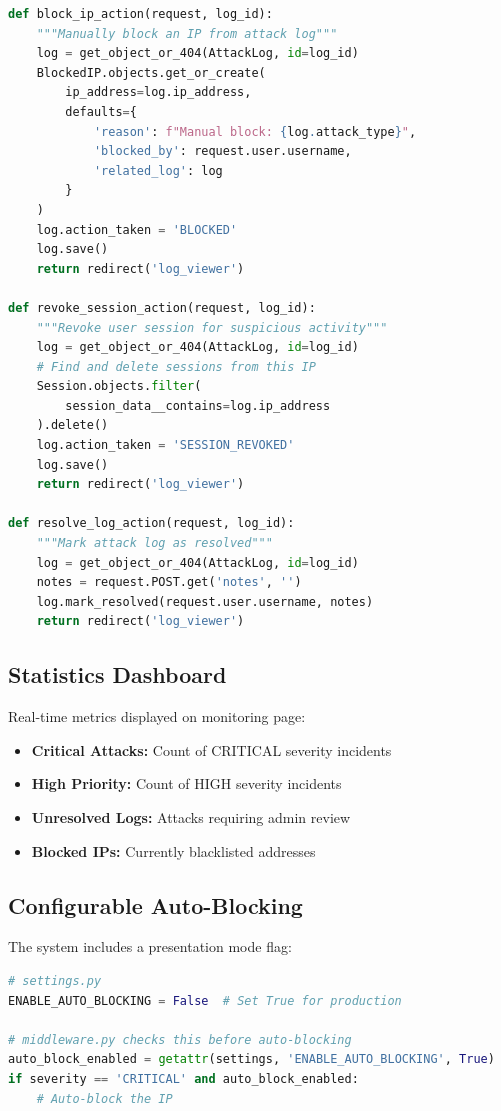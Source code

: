 \documentclass[12pt,a4paper]{article}
\begin{document}
\begin{lstlisting}[language=Python]
def block_ip_action(request, log_id):
    """Manually block an IP from attack log"""
    log = get_object_or_404(AttackLog, id=log_id)
    BlockedIP.objects.get_or_create(
        ip_address=log.ip_address,
        defaults={
            'reason': f"Manual block: {log.attack_type}",
            'blocked_by': request.user.username,
            'related_log': log
        }
    )
    log.action_taken = 'BLOCKED'
    log.save()
    return redirect('log_viewer')

def revoke_session_action(request, log_id):
    """Revoke user session for suspicious activity"""
    log = get_object_or_404(AttackLog, id=log_id)
    # Find and delete sessions from this IP
    Session.objects.filter(
        session_data__contains=log.ip_address
    ).delete()
    log.action_taken = 'SESSION_REVOKED'
    log.save()
    return redirect('log_viewer')

def resolve_log_action(request, log_id):
    """Mark attack log as resolved"""
    log = get_object_or_404(AttackLog, id=log_id)
    notes = request.POST.get('notes', '')
    log.mark_resolved(request.user.username, notes)
    return redirect('log_viewer')
\end{lstlisting}

\subsection{Statistics Dashboard}

Real-time metrics displayed on monitoring page:

\begin{itemize}[leftmargin=*]
    \item \textbf{Critical Attacks:} Count of CRITICAL severity incidents
    \item \textbf{High Priority:} Count of HIGH severity incidents  
    \item \textbf{Unresolved Logs:} Attacks requiring admin review
    \item \textbf{Blocked IPs:} Currently blacklisted addresses
\end{itemize}

\subsection{Configurable Auto-Blocking}

The system includes a presentation mode flag:

\begin{lstlisting}[language=Python]
# settings.py
ENABLE_AUTO_BLOCKING = False  # Set True for production

# middleware.py checks this before auto-blocking
auto_block_enabled = getattr(settings, 'ENABLE_AUTO_BLOCKING', True)
if severity == 'CRITICAL' and auto_block_enabled:
    # Auto-block the IP
\end{lstlisting}
\end{document}

